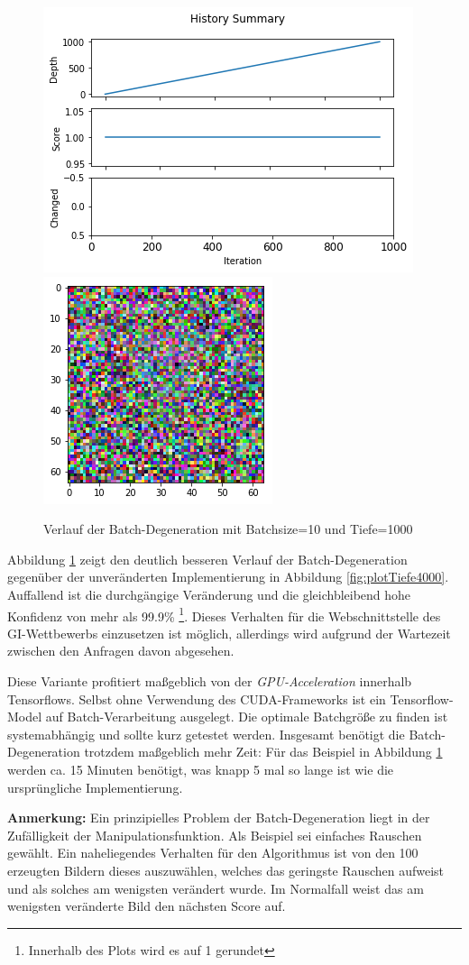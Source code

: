\begin{figure}[h]
	\centering
	\includegraphics[width=0.5\linewidth]{Images/DegenSamples/BatchDegPlotTiefe1000}
	\includegraphics[width=0.35\linewidth]{Images/DegenSamples/BatchDegTiefe1000}
	\caption[Batch-Degeneration-Plot]{Verlauf der Batch-Degeneration mit Batchsize=10 und Tiefe=1000}
	\label{fig:batchdegplottiefe1000}
\end{figure}

Abbildung \ref{fig:batchdegplottiefe1000} zeigt den deutlich besseren Verlauf der Batch-Degeneration gegenüber der unveränderten Implementierung in Abbildung \ref{fig:plotTiefe4000}. Auffallend ist die durchgängige Veränderung und die gleichbleibend hohe Konfidenz von mehr als 99.9\% \footnote{Innerhalb des Plots wird es auf 1 gerundet}. Dieses Verhalten für die Webschnittstelle des \ac{GI}-Wettbewerbs einzusetzen ist möglich, allerdings wird aufgrund der Wartezeit zwischen den Anfragen davon abgesehen. 

Diese Variante profitiert maßgeblich von der \textit{GPU-Acceleration} innerhalb Tensorflows. Selbst ohne Verwendung des CUDA-Frameworks ist ein Tensorflow-Model auf Batch-Verarbeitung ausgelegt. Die optimale Batchgröße zu finden ist systemabhängig und sollte kurz getestet werden. Insgesamt benötigt die Batch-Degeneration trotzdem maßgeblich mehr Zeit: Für das Beispiel in Abbildung \ref{fig:batchdegplottiefe1000} werden ca. 15 Minuten benötigt, was knapp 5 mal so lange ist wie die ursprüngliche Implementierung. 

\textbf{Anmerkung:} Ein prinzipielles Problem der Batch-Degeneration liegt in der Zufälligkeit der Manipulationsfunktion. Als Beispiel sei einfaches Rauschen gewählt. Ein naheliegendes Verhalten für den Algorithmus ist von den 100 erzeugten Bildern dieses auszuwählen, welches das geringste Rauschen aufweist und als solches am wenigsten verändert wurde. Im Normalfall weist das am wenigsten veränderte Bild den nächsten Score auf. 


